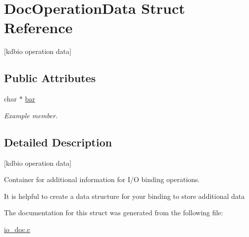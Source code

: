 \hypertarget{structDocOperationData}{}\section{Doc\+Operation\+Data Struct Reference}
\label{structDocOperationData}


\mbox{[}kdbio operation data\mbox{]}  


\subsection*{Public Attributes}
\begin{DoxyCompactItemize}
\item 
\mbox{\label{structDocOperationData_aae15fddcc4a8c6e7a9faaebe4f9964ec}} 
char $\ast$ \mbox{\hyperlink{structDocOperationData_aae15fddcc4a8c6e7a9faaebe4f9964ec}{bar}}
\begin{DoxyCompactList}\small\item\em Example member. \end{DoxyCompactList}\end{DoxyCompactItemize}


\subsection{Detailed Description}
\mbox{[}kdbio operation data\mbox{]} 

Container for additional information for I/O binding operations.

It is helpful to create a data structure for your binding to store additional data 

The documentation for this struct was generated from the following file\+:\begin{DoxyCompactItemize}
\item 
\mbox{\hyperlink{io__doc_8c}{io\+\_\+doc.\+c}}\end{DoxyCompactItemize}
